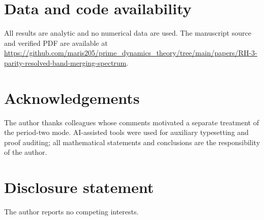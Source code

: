 \documentclass[11pt]{article}
\theoremstyle{definition}
\theoremstyle{remark}
\begin{document}
\section*{Data and code availability}

All results are analytic and no numerical data are used.  The manuscript source and verified PDF are available at \url{https://github.com/maris205/prime_dynamics_theory/tree/main/papers/RH-3-parity-resolved-band-merging-spectrum}.

\section*{Acknowledgements}

The author thanks colleagues whose comments motivated a separate treatment of the period-two mode.  AI-assisted tools were used for auxiliary typesetting and proof auditing; all mathematical statements and conclusions are the responsibility of the author.

\section*{Disclosure statement}

The author reports no competing interests.



\end{document}
